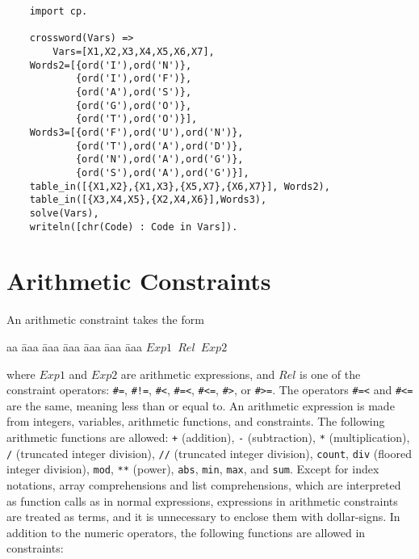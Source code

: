 \begin{verbatim}
    import cp.

    crossword(Vars) =>
        Vars=[X1,X2,X3,X4,X5,X6,X7], 
    Words2=[{ord('I'),ord('N')},
            {ord('I'),ord('F')},
            {ord('A'),ord('S')},
            {ord('G'),ord('O')},
            {ord('T'),ord('O')}],
    Words3=[{ord('F'),ord('U'),ord('N')},
            {ord('T'),ord('A'),ord('D')},
            {ord('N'),ord('A'),ord('G')},
            {ord('S'),ord('A'),ord('G')}],
    table_in([{X1,X2},{X1,X3},{X5,X7},{X6,X7}], Words2),
    table_in([{X3,X4,X5},{X2,X4,X6}],Words3),
    solve(Vars),
    writeln([chr(Code) : Code in Vars]).
\end{verbatim}

\section{Arithmetic Constraints}
An arithmetic constraint takes the form
\begin{tabbing}
aa \= aaa \= aaa \= aaa \= aaa \= aaa \= aaa \kill
\> \texttt{$Exp1$ $Rel$ $Exp2$} 
\end{tabbing}
where $Exp1$ and $Exp2$ are arithmetic expressions, and $Rel$ is one of the constraint operators:  \verb+#=+, \verb+#!=+, \verb+#<+, \verb+#=<+, \verb+#<=+, \verb+#>+, or \verb+#>=+. The operators \verb+#=<+ and \verb+#<=+ are the same, meaning less than or equal to. An arithmetic expression is made from integers, variables, arithmetic functions, and constraints. The following arithmetic functions are allowed: \texttt{+} (addition), \texttt{-} (subtraction), \texttt{*} (multiplication), \texttt{/} (truncated integer division), \texttt{//} (truncated integer division), \texttt{count}, \texttt{div} (floored integer division), \texttt{mod}, \texttt{**} (power), \texttt{abs}, \texttt{min}, \texttt{max}, and \texttt{sum}.  Except for index notations, array comprehensions and list comprehensions, which are interpreted as function calls as in normal expressions, expressions in arithmetic constraints are treated as terms, and it is unnecessary to enclose them with dollar-signs. In addition to the numeric operators, the following functions are allowed in constraints:
